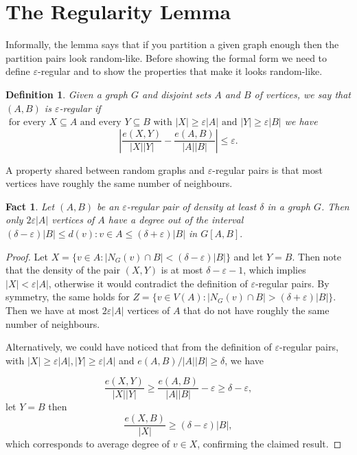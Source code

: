 \documentclass[12pt,twoside,a4paper,bibliography=totocnumbered]{book}
\numberwithin{equation}{section}
\newtheorem{definition}	[theorem] {Definition}
\newtheorem{fact}	[theorem] {Fact}
\theoremstyle{remark}
\begin{document}
\section{The Regularity Lemma}

Informally, the lemma says that if you partition a given graph enough then the partition pairs look random-like. Before showing the formal form we need to define $\varepsilon$-regular and to show the properties that make it looks random-like.

\begin{definition}
Given a graph $G$ and disjoint sets $A$ and $B$ of vertices, we say that $(A,B)$ is $\varepsilon$-regular if $\text{ for every } X \subseteq A \text{ and every } Y \subseteq B\text{ with } |X| \geq \varepsilon|A| \text{ and } |Y| \geq \varepsilon |B|$ we have
$$ \left| \frac{e(X,Y)}{|X||Y|} - \frac{e(A,B)}{|A||B|} \right| \leq \varepsilon  .$$
\end{definition}


A property shared between random graphs and $\varepsilon$-regular pairs is that most vertices have roughly the same number of neighbours.

\begin{fact}\label{fact:503}
Let $(A,B)$ be an $\varepsilon$-regular pair of density at least $\delta$ in a graph $G$. Then only $2 \varepsilon |A| $ vertices of $A$ have a degree out of the interval $(\delta - \varepsilon)|B| \leq d(v): v \in A \leq (\delta + \varepsilon)|B|$ in $G[A,B].$
\end{fact}
\begin{proof}
Let $X = \{v \in A \colon | N_G(v) \cap B | < (\delta-\varepsilon)|B|\}$ and let $Y=B$. Then note that the density of the pair $(X,Y)$ is at most  $\delta - \varepsilon -1$, which implies $|X| < \varepsilon |A|$, otherwise it would contradict the definition of $\varepsilon$-regular pairs. By symmetry, the same holds for $Z = \{ v \in V(A) \colon |N_G(v) \cap B| > (\delta+\varepsilon)|B|\}$. Then we have at most $2 \varepsilon |A| $ vertices of $A$ that do not have roughly the same number of neighbours.

Alternatively, we could have noticed that from the definition of $\varepsilon$-regular pairs, with $|X| \geq \varepsilon|A|, |Y|\geq \varepsilon|A|$ and $e(A,B)/|A||B| \geq \delta $, we have

$$ \frac{e(X,Y)}{|X||Y|} \geq \frac{e(A,B)}{|A||B|} - \varepsilon \geq \delta - \varepsilon,$$
let $Y = B$ then
$$ \frac{e(X,B)}{|X|} \geq (\delta - \varepsilon)|B|,$$
which corresponds to average degree of $v \in X$, confirming the claimed result.
\end{proof}
\end{document}
